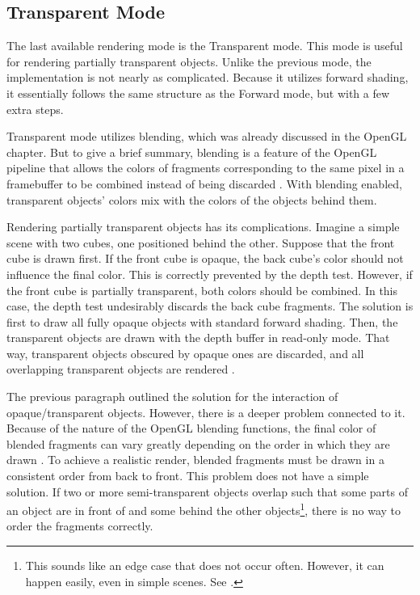 \documentclass[
  digital,     %
  oneside,     %
  nosansbold,  %
  nocolorbold, %
  lof,         %
  lot,         %
]{fithesis4}
\begin{document}
\subsection{Transparent Mode}
The last available rendering mode is the Transparent mode. This mode is useful for rendering partially
transparent objects. Unlike the previous mode, the implementation is not nearly as complicated.
Because it utilizes forward shading, it essentially follows the same structure as the Forward mode,
but with a few extra steps.

Transparent mode utilizes blending, which was already discussed in the OpenGL chapter.
But to give a brief summary, blending is a feature of the OpenGL pipeline that
allows the colors of fragments corresponding to the same pixel in a framebuffer to be combined
instead of being discarded \cite[p.251]{opengl-book}. With blending enabled,
transparent objects' colors mix with the colors of the objects behind them.

Rendering partially transparent objects has its complications. Imagine a simple scene
with two cubes, one positioned behind the other. Suppose
that the front cube is drawn first. If the front cube is opaque, the back cube's
color should not influence the final color. This is correctly prevented by the depth test.
However, if the front cube is partially transparent, both colors should be combined.
In this case, the depth test undesirably discards the back cube fragments.
The solution is first to draw all fully opaque objects with standard forward shading.
Then, the transparent objects are drawn with the depth buffer in read-only mode.
That way, transparent objects obscured by opaque ones are discarded, and all overlapping
transparent objects are rendered \cite[p.263]{opengl-book}.

The previous paragraph outlined the solution for the interaction of opaque/transparent
objects. However, there is a deeper problem connected to it.
Because of the nature of the OpenGL blending functions, the final color of blended
fragments can vary greatly depending on the order in which they are drawn \cite[p.263]{opengl-book}.
To achieve a realistic render, blended fragments must be drawn in a consistent
order from back to front. This problem does not have a simple solution.
If two or more semi-transparent objects overlap such that some parts of an object are
in front of and some behind the other objects\footnote{This sounds like an edge case that does not occur often.
However, it can happen easily, even in simple scenes. See \cite{alpha-sorting}.},
there is no way to order the fragments correctly.
\end{document}
